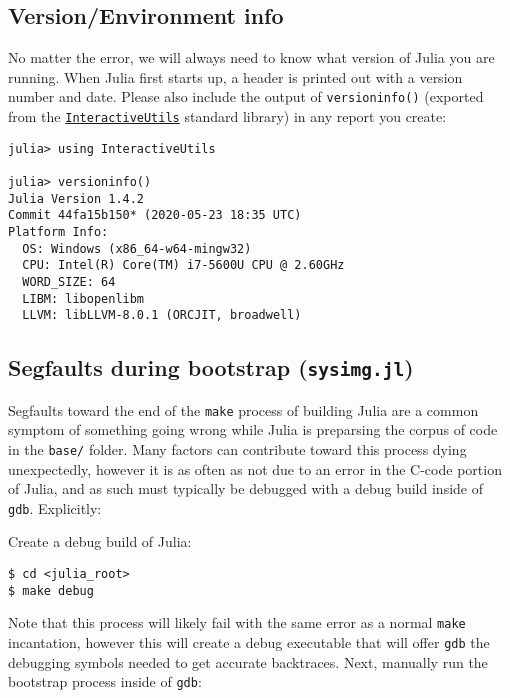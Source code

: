 \hypertarget{13046485394122703550}{}


\subsection{Version/Environment info}



No matter the error, we will always need to know what version of Julia you are running. When Julia first starts up, a header is printed out with a version number and date. Please also include the output of \texttt{versioninfo()} (exported from the \hyperlink{11698106121547091928}{\texttt{InteractiveUtils}} standard library) in any report you create:




\begin{verbatim}
julia> using InteractiveUtils

julia> versioninfo()
Julia Version 1.4.2
Commit 44fa15b150* (2020-05-23 18:35 UTC)
Platform Info:
  OS: Windows (x86_64-w64-mingw32)
  CPU: Intel(R) Core(TM) i7-5600U CPU @ 2.60GHz
  WORD_SIZE: 64
  LIBM: libopenlibm
  LLVM: libLLVM-8.0.1 (ORCJIT, broadwell)
\end{verbatim}



\hypertarget{3553581061539675492}{}


\subsection{Segfaults during bootstrap (\texttt{sysimg.jl})}



Segfaults toward the end of the \texttt{make} process of building Julia are a common symptom of something going wrong while Julia is preparsing the corpus of code in the \texttt{base/} folder.  Many factors can contribute toward this process dying unexpectedly, however it is as often as not due to an error in the C-code portion of Julia, and as such must typically be debugged with a debug build inside of \texttt{gdb}.  Explicitly:



Create a debug build of Julia:




\begin{lstlisting}
$ cd <julia_root>
$ make debug
\end{lstlisting}



Note that this process will likely fail with the same error as a normal \texttt{make} incantation, however this will create a debug executable that will offer \texttt{gdb} the debugging symbols needed to get accurate backtraces.  Next, manually run the bootstrap process inside of \texttt{gdb}:




